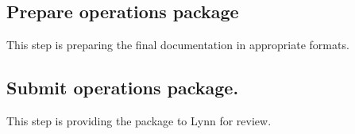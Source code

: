 \documentclass[11pt]{article}
\begin{document}
\subsection{{\bfseries\sffamily Prepare} operations package}
\label{sec-1-4}
This step is preparing the final documentation in appropriate
formats.
\subsection{{\bfseries\sffamily Submit} operations package.}
\label{sec-1-5}
This step is providing the package to Lynn for review.
\end{document}
